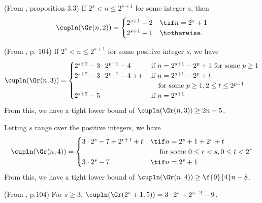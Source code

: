 \begin{proposition}\label{prop:cup-Grn2}
    (From \cite{pavesic2021}, proposition 3.3)
    If $2^s < n \leq 2^{s+1}$ for some integer $s$, then
    \[
        \cupln(\Gr(n,2))
        = \begin{cases}
            2^{s+1} - 2 &\tif n = 2^s + 1 \\
            2^{s+1} - 1 &\totherwise.
        \end{cases}
    \]
\end{proposition}

\begin{proposition}\label{prop:cup-Grn3}
    (From \cite{stong1982}, p. 104)
    If $2^s < n \leq 2^{s+1}$ for some positive integer $s$, we have
    \[
        \cupln(\Gr(n,3))
        = \begin{cases}
            2^{s + 2} - 3 \cdot 2^{p - 1} - 4 &\text{ if } n = 2^{s+1} - 2^{p} + 1 \text{ for some } p \geq 1 \\
            2^{s + 2} - 3 \cdot 2^{p - 1} - 4 + t &\text{ if } n = 2^{s+1} - 2^{p} + t\\
            &\quad\text{ for some } p \geq 1, 2 \leq t \leq 2^{p-1} \\
            2^{s + 2} - 5 &\text{ if } n = 2^{s+1} \\
        \end{cases}
    \]
    From this, we have a tight lower bound of $\cupln(\Gr(n,3)) \geq 2n - 5$.
\end{proposition}

\begin{proposition}\label{prop:cup-Grn4}
    Letting $s$ range over the positive integers, we have
    \[
        \cupln(\Gr(n,4))
        = \begin{cases}
            3 \cdot 2^s - 7 + 2^{r+1} + t &\tif n = 2^s + 1 + 2^r + t \\
            &\quad\text{ for some } 0 \leq r < s, 0 \leq t < 2^r \\
            3 \cdot 2^s - 7 &\tif n = 2^s + 1
        \end{cases}
    \]
    From this, we have a tight lower bound of $\cupln(\Gr(n,4)) \geq \f{9}{4} n - 8$.
\end{proposition}

\begin{proposition}\label{prop:cup-Grn5-partial}
    (From \cite{stong1982}, p.104)
    For $s \geq 3$, $\cupln(\Gr(2^s+1,5)) = 3 \cdot 2^s + 2^{s-2} - 9$.
\end{proposition}

